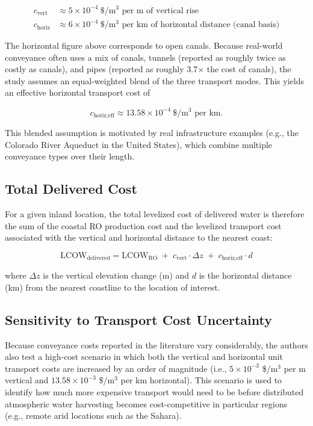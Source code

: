 \documentclass[11pt]{article}
\begin{document}
\begin{align}
c_{\text{vert}} &\approx 5 \times 10^{-4}\ \$/\text{m}^3\text{ per m of vertical rise} \\
c_{\text{horiz}} &\approx 6 \times 10^{-4}\ \$/\text{m}^3\text{ per km of horizontal distance (canal basis)}
\end{align}

The horizontal figure above corresponds to open canals. Because real-world
conveyance often uses a mix of canals, tunnels (reported as roughly twice as
costly as canals), and pipes (reported as roughly 3.7$\times$ the cost of
canals), the study assumes an equal-weighted blend of the three
transport modes. This yields an effective horizontal transport cost of

\begin{equation}
c_{\text{horiz,eff}} \approx 13.58 \times 10^{-4}\ \$/\text{m}^3\text{ per km}.
\end{equation}

This blended assumption is motivated by real infrastructure examples (e.g.,
the Colorado River Aqueduct in the United States), which combine multiple
conveyance types over their length.

\subsection{Total Delivered Cost}

For a given inland location, the total levelized cost of delivered water is
therefore the sum of the coastal RO production cost and the levelized
transport cost associated with the vertical and horizontal distance to the
nearest coast:

\begin{equation}
\text{LCOW}_{\text{delivered}} = \text{LCOW}_{\text{RO}} \;+\; c_{\text{vert}} \cdot \Delta z \;+\; c_{\text{horiz,eff}} \cdot d
\end{equation}

where $\Delta z$ is the vertical elevation change (m) and $d$ is the
horizontal distance (km) from the nearest coastline to the location of
interest.

\subsection{Sensitivity to Transport Cost Uncertainty}

Because conveyance costs reported in the literature vary considerably, the
authors also test a high-cost scenario in which both the vertical and
horizontal unit transport costs are increased by an order of magnitude
(i.e., $5\times10^{-3}$ \$/m$^3$ per m vertical and
$13.58\times10^{-3}$ \$/m$^3$ per km horizontal). This scenario is used to
identify how much more expensive transport would need to be before
distributed atmospheric water harvesting becomes cost-competitive in
particular regions (e.g., remote arid locations such as the Sahara).
\end{document}
